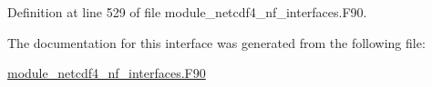 Definition at line 529 of file module\+\_\+netcdf4\+\_\+nf\+\_\+interfaces.\+F90.



The documentation for this interface was generated from the following file\+:\begin{DoxyCompactItemize}
\item 
\hyperlink{module__netcdf4__nf__interfaces_8F90}{module\+\_\+netcdf4\+\_\+nf\+\_\+interfaces.\+F90}\end{DoxyCompactItemize}
